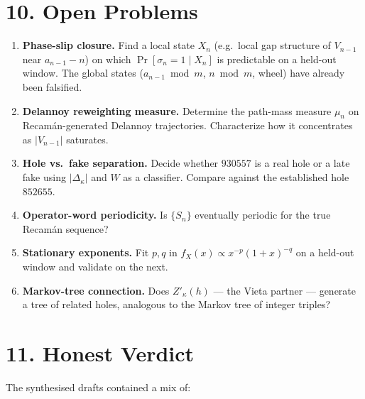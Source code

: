 \documentclass[
  11pt,
]{article}
\providecommand{\tightlist}{%
  \setlength{\itemsep}{0pt}\setlength{\parskip}{0pt}}
\begin{document}
\hypertarget{open-problems}{%
\section{10. Open Problems}\label{open-problems}}

\begin{enumerate}
\def\labelenumi{\arabic{enumi}.}
\tightlist
\item
  \textbf{Phase-slip closure.} Find a local state \(X_n\) (e.g.~local
  gap structure of \(V_{n-1}\) near \(a_{n-1} - n\)) on which
  \(\Pr[\sigma_n = 1 \mid X_n]\) is predictable on a held-out window.
  The global states (\(a_{n-1} \bmod m\), \(n \bmod m\), wheel) have
  already been falsified.
\item
  \textbf{Delannoy reweighting measure.} Determine the path-mass measure
  \(\mu_n\) on Recamán-generated Delannoy trajectories. Characterize how
  it concentrates as \(|V_{n-1}|\) saturates.
\item
  \textbf{Hole vs.~fake separation.} Decide whether \(930557\) is a real
  hole or a late fake using \(|\Delta_\kappa|\) and \(W\) as a
  classifier. Compare against the established hole \(852655\).
\item
  \textbf{Operator-word periodicity.} Is \(\{S_n\}\) eventually periodic
  for the true Recamán sequence?
\item
  \textbf{Stationary exponents.} Fit \(p, q\) in
  \(f_X(x) \propto x^{-p}(1+x)^{-q}\) on a held-out window and validate
  on the next.
\item
  \textbf{Markov-tree connection.} Does \(Z'_\kappa(h)\) --- the Vieta
  partner --- generate a tree of related holes, analogous to the Markov
  tree of integer triples?
\end{enumerate}

\hypertarget{honest-verdict}{%
\section{11. Honest Verdict}\label{honest-verdict}}

The synthesised drafts contained a mix of:
\end{document}
